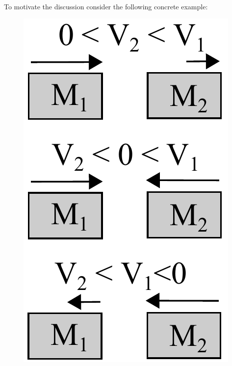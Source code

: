 \documentclass{article}
\begin{document}
To motivate the discussion consider the following concrete example:  
\begin{figure}
\begin{center}
\begin{minipage}{\linewidth/6}
                \includegraphics[width=1\linewidth]{Figs/little-momentum0.pdf}

\end{minipage}
\end{center}
\end{figure}
\end{document}
